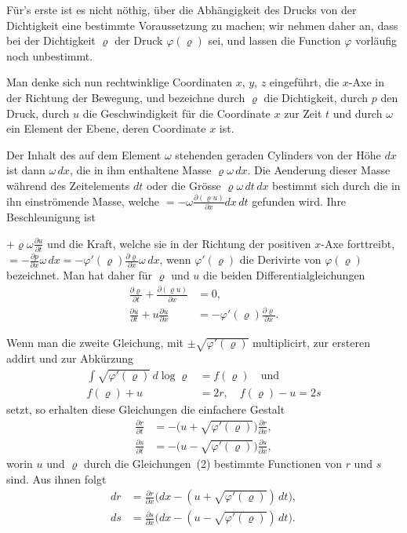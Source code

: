 \documentclass[12pt,a4paper]{book}
\theoremstyle{definition}
\theoremstyle{remark}
\begin{document}
F\"ur's erste ist es nicht n\"othig, \"uber die Abh\"angigkeit des Drucks von der Dichtigkeit eine bestimmte Voraussetzung zu machen; wir nehmen daher an, dass bei der Dichtigkeit $\varrho$ der Druck $\varphi(\varrho)$ sei, und lassen die Function $\varphi$ vorl\"aufig noch unbestimmt.

Man denke sich nun rechtwinklige Coordinaten $x$, $y$, $z$ eingef\"uhrt, die $x$-Axe in der Richtung der Bewegung, und bezeichne durch $\varrho$ die Dichtigkeit, durch $p$ den Druck, durch $u$ die Geschwindigkeit f\"ur die Coordinate $x$ zur Zeit $t$ und durch $\omega$ ein Element der Ebene, deren Coordinate $x$ ist.

Der Inhalt des auf dem Element $\omega$ stehenden geraden Cylinders von der H\"ohe $dx$ ist dann $\omega\,dx$, die in ihm enthaltene Masse $\varrho\omega\,dx$. Die Aenderung dieser Masse w\"ahrend des Zeitelements $dt$ oder die Gr\"osse $\varrho\omega\,dt\,dx$ bestimmt sich durch die in ihn einstr\"omende Masse, welche $= -\omega\frac{\partial(\varrho u)}{\partial x}dx\,dt$ gefunden wird. Ihre Beschleunigung ist

$+\varrho\omega\frac{\partial u}{\partial t}$ und die Kraft, welche sie in der Richtung der positiven $x$-Axe forttreibt, $= -\frac{\partial p}{\partial x}\omega\,dx = -\varphi'(\varrho)\frac{\partial\varrho}{\partial x}\omega\,dx$, wenn $\varphi'(\varrho)$ die Derivirte von $\varphi(\varrho)$ bezeichnet. Man hat daher f\"ur $\varrho$ und $u$ die beiden Differentialgleichungen
\begin{align*}
\frac{\partial\varrho}{\partial t} + \frac{\partial(\varrho u)}{\partial x} &= 0,\tag{1}\\
\frac{\partial u}{\partial t} + u\frac{\partial u}{\partial x} &= -\varphi'(\varrho)\frac{\partial\varrho}{\partial x}.\tag{2}
\end{align*}

Wenn man die zweite Gleichung, mit $\pm\sqrt{\varphi'(\varrho)}$ multiplicirt, zur ersteren addirt und zur Abk\"urzung
\begin{align*}
\int\sqrt{\varphi'(\varrho)}\,d\log\varrho &= f(\varrho)\quad\text{und}\\
f(\varrho) + u &= 2r,\quad f(\varrho) - u = 2s\tag{2}
\end{align*}
setzt, so erhalten diese Gleichungen die einfachere Gestalt
\begin{align*}
\frac{\partial r}{\partial t} &= -\bigl(u + \sqrt{\varphi'(\varrho)}\bigr)\frac{\partial r}{\partial x},\\
\frac{\partial s}{\partial t} &= -\bigl(u - \sqrt{\varphi'(\varrho)}\bigr)\frac{\partial s}{\partial x},\tag{3}
\end{align*}
worin $u$ und $\varrho$ durch die Gleichungen~(2) bestimmte Functionen von $r$ und $s$ sind. Aus ihnen folgt
\begin{align*}
dr &= \frac{\partial r}{\partial x}\bigl(dx - (u + \sqrt{\varphi'(\varrho)})\,dt\bigr),\\
ds &= \frac{\partial s}{\partial x}\bigl(dx - (u - \sqrt{\varphi'(\varrho)})\,dt\bigr).\tag{4,5}
\end{align*}
\end{document}
